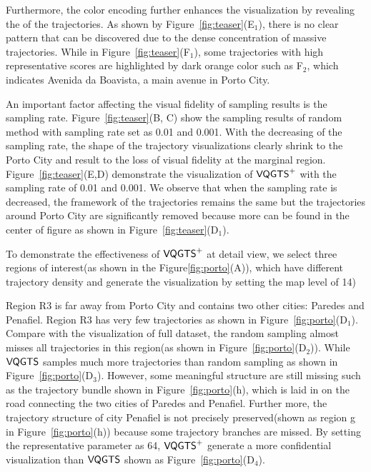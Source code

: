 Furthermore, the color encoding further enhances the visualization by revealing the  of the trajectories.
As shown by Figure~\ref{fig:teaser}(E$_1$), there is no clear pattern that can be discovered due to the dense concentration of massive trajectories. While in Figure~\ref{fig:teaser}(F$_1$), some trajectories with high representative scores are highlighted by dark orange color such as F$_2$, which indicates Avenida da Boavista, a main avenue in Porto City. 
 
 
An important factor affecting the visual fidelity of sampling results is the sampling rate. Figure~\ref{fig:teaser}(B, C) show the sampling results of random method with sampling rate set as 0.01 and 0.001. With the decreasing of the sampling rate, the shape of the trajectory visualizations clearly shrink to the Porto City and result to the loss of visual fidelity at the marginal region. Figure~\ref{fig:teaser}(E,D) demonstrate the visualization of $\mathsf{VQGTS}^{+}$ with the sampling rate of 0.01 and 0.001. We observe that when the sampling rate is decreased, the framework of the trajectories remains the same but the trajectories around Porto City are significantly removed because more  can be found in the center of figure as shown in Figure~\ref{fig:teaser}(D$_1$). 

To demonstrate the effectiveness of $\mathsf{VQGTS}^{+}$ at detail view, we select three regions of interest(as shown in the Figure\ref{fig:porto}(A)), which have different trajectory density and generate the visualization by setting the map level of 14) 
   
Region R3 is far away from Porto City and contains two other cities: Paredes and Penafiel. Region R3 has very few trajectories as shown in Figure~\ref{fig:porto}(D$_1$).  Compare with the visualization of full dataset, the random sampling almost misses all trajectories in this region(as shown in Figure~\ref{fig:porto}(D$_2$)). While $\mathsf{VQGTS}$ samples much more trajectories than random sampling as shown in Figure~\ref{fig:porto}(D$_3$). However, some meaningful structure are still missing such as the trajectory bundle shown in Figure~\ref{fig:porto}(h), which is laid in on the road  connecting the two cities of Paredes and Penafiel. Further more, the trajectory structure of city Penafiel is not precisely preserved(shown as region g in Figure~\ref{fig:porto}(h)) because some  trajectory branches are missed.  
By setting the representative parameter as 64, $\mathsf{VQGTS}^{+}$ generate a more confidential visualization than $\mathsf{VQGTS}$ shown as Figure~\ref{fig:porto}(D$_4$). 

